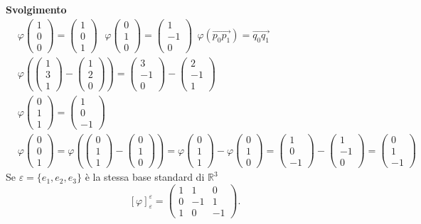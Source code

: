\documentclass[12px]{article}
\theoremstyle{break}
\theoremstyle{break}
\theoremstyle{break}
\theoremstyle{break}
\theoremstyle{break}
\theoremstyle{break}
\newcommand{\icol}[1]{%
  \left(\begin{smallmatrix}#1\end{smallmatrix}\right)%
}
\begin{document}
\textbf{Svolgimento}
\begin{align*}
	&\varphi\icol{1\\0\\0} = \icol{1\\0\\1} \ \ \ \varphi\icol{0\\1\\0} = \icol{1\\-1\\0} \ \ \varphi( \overrightarrow{p_0p_1}) = \overrightarrow{q_0q_1}\\
	&	\varphi(\icol{1\\3\\1} - \icol{1\\2\\0}) = \icol{3\\-1\\0} - \icol{2\\-1\\1} \\
	&\varphi\icol{0\\1\\1} = \icol{1\\0\\-1} \\
	&\varphi\icol{0\\0\\1} = \varphi(\icol{0\\1\\1}-\icol{0\\1\\0}) = \varphi\icol{0\\1\\1} - \varphi\icol{0\\1\\0} = \icol{1\\0\\-1}-\icol{1\\-1\\0} = \icol{0\\1\\-1}
\end{align*}
Se $\varepsilon = \{e_1,e_2,e_3\}$ è la stessa base standard di $\mathbb{R}^3$
\[
	[\varphi]^\varepsilon_ \varepsilon = \icol{1 & 1 & 0\\ 0 &-1&1\\1&0&-1}
.\] 
\end{document}
